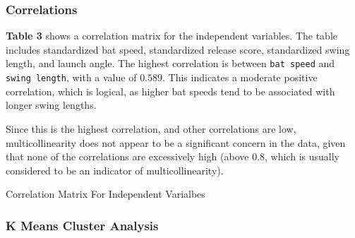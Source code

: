 \documentclass[
  letterpaper,
  DIV=11,
  numbers=noendperiod]{scrartcl}
\begin{document}
\subsubsection{Correlations}\label{correlations}

\textbf{Table 3} shows a correlation matrix for the independent
variables. The table includes standardized bat speed, standardized
release score, standardized swing length, and launch angle. The highest
correlation is between \texttt{bat\ speed} and \texttt{swing\ length},
with a value of \(0.589\). This indicates a moderate positive
correlation, which is logical, as higher bat speeds tend to be
associated with longer swing lengths.

Since this is the highest correlation, and other correlations are low,
multicollinearity does not appear to be a significant concern in the
data, given that none of the correlations are excessively high (above
0.8, which is usually considered to be an indicator of
multicollinearity).

\begin{table}

\caption{\label{tbl-3}Correlation Matrix For Independent Varialbes}


\end{table}%

\subsubsection{K Means Cluster Analysis}\label{k-means-cluster-analysis}
\end{document}
